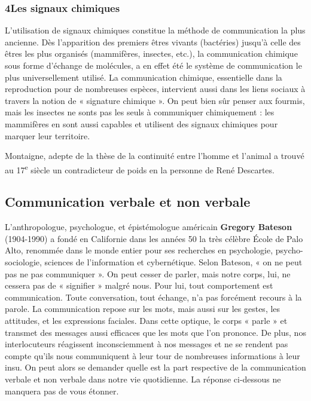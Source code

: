 \subsubsection*{4\quad Les signaux chimiques}
L’utilisation de signaux chimiques constitue la méthode de communication la plus ancienne. Dès l’apparition des premiers êtres vivants (bactéries) jusqu’à celle des êtres les plus organisés (mammifères, insectes, etc.), la communication chimique sous forme d’échange de molécules, a en effet été le système de communication le plus universellement utilisé. La communication chimique, essentielle dans la reproduction pour de nombreuses espèces, intervient aussi dans les liens sociaux à travers la notion de « signature chimique ». On peut bien sûr penser aux fourmis, mais les insectes ne sonts pas les seuls à communiquer chimiquement : les mammifères en sont aussi capables et utilisent des signaux chimiques pour marquer leur territoire.

Montaigne, adepte de la thèse de la continuité entre l’homme et l’animal a trouvé au 17\textsuperscript{e} siècle un contradicteur de poids en la personne de René Descartes.
\subsection{Communication verbale et non verbale}
L’anthropologue, psychologue, et épistémologue américain \textbf{Gregory Bateson} (1904-1990) a fondé en Californie dans les années 50 la très célèbre École de Palo Alto, renommée dans le monde entier pour ses recherches en psychologie, psycho-sociologie, sciences de l’information et cybernétique. Selon Bateson, « on ne peut pas ne pas communiquer ». On peut cesser de parler, mais notre corps, lui, ne cessera pas de « signifier » malgré nous. Pour lui, tout comportement est communication. Toute conversation, tout échange, n’a pas forcément recours à la parole. La communication repose sur les mots, mais aussi sur les gestes, les attitudes, et les expressions faciales. Dans cette optique, le corps « parle » et transmet des messages aussi efficaces que les mots que l’on prononce. De plus, nos interlocuteurs réagissent inconsciemment à nos messages et ne se rendent pas compte qu’ils nous communiquent à leur tour de nombreuses informations à leur insu. On peut alors se demander quelle est la part respective de la communication verbale et non verbale dans notre vie quotidienne. La réponse ci-dessous ne manquera pas de vous étonner.
